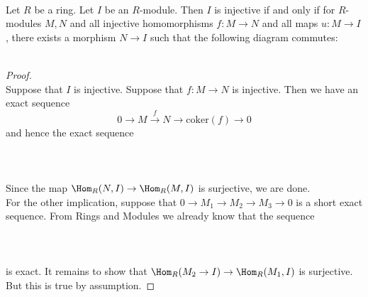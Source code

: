 \documentclass[a4paper]{article}
\begin{document}
\begin{prp}{}{}\\
Let $R$ be a ring. Let $I$ be an $R$-module. Then $I$ is injective if and only if for $R$-modules $M,N$ and all injective homomorphisms $f:M\to N$ and all maps $u:M\to I$, there exists a morphism $N\to I$ such that the following diagram commutes: \\
\\
\begin{proof}\\
Suppose that $I$ is injective. Suppose that $f:M\to N$ is injective. Then we have an exact sequence $$0\to M\overset{f}{\to} N\to\text{coker}(f)\to 0$$ and hence the exact sequence \\~\\
\\~\\
Since the map $\Hom_R(N,I)\to\Hom_R(M,I)$ is surjective, we are done. \\

For the other implication, suppose that $0\to M_1\to M_2\to M_3\to 0$ is a short exact sequence. From Rings and Modules we already know that the sequence \\~\\
\\~\\
is exact. It remains to show that $\Hom_R(M_2\to I)\to\Hom_R(M_1,I)$ is surjective. But this is true by assumption. 
\end{proof}
\end{prp}
\end{document}
